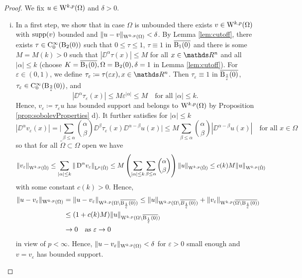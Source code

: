 \begin{proof}
  We fix $u \in \mathrm{W}^{k,p}(\Omega)$ and $\delta > 0$.
  \begin{enumerate}[i)]
    \item In a first step, we show that in case $\Omega$ is unbounded there exists $v \in \mathrm{W}^{k,p}(\Omega)$ with $\operatorname{supp}(v)$ bounded and $\|u - v\|_{\mathrm{W}^{k,p}(\Omega)} < \delta$.
      By Lemma \ref{lem:cutoff}, there exists $\tau \in \mathrm{C}_0^\infty(\mathrm{B}_2(0))$ such that $0 \leq \tau \leq 1$, $\tau \equiv 1$ in $\overline{\mathrm{B}_1(0)}$ and there is some $M = M(k) > 0$ such that $|\DD^\alpha \tau(x)| \leq M$ for all $x \in \R^n$ and all $|\alpha| \leq k$ (choose $K = \overline{\mathrm{B}_1(0)}, \Omega= \mathrm{B}_2(0), \delta = 1$ in Lemma \ref{lem:cutoff}).
      For $\varepsilon \in (0,1)$, we define $\tau_\varepsilon \coloneqq \tau(\varepsilon x), x \in \R^n$.
      Then $\tau_\varepsilon \equiv 1$ in $\overline{\mathrm{B}_{\frac{1}{\varepsilon}}(0)}$, $\tau_\varepsilon \in \mathrm{C}_0^\infty(\mathrm{B}_{\frac{2}{\varepsilon}}(0))$, and
      \begin{equation}
        |\DD^\alpha \tau_\varepsilon(x)| \leq M \varepsilon^{|\alpha|} \leq M \quad\text{for all } |\alpha| \leq k.
      \end{equation}
      Hence, $v_\varepsilon \coloneqq \tau_\varepsilon u$ has bounded support and belongs to $\mathrm{W}^{k,p}(\Omega)$ by Proposition \ref{prop:sobolevProperties} d).
      It further satisfies for $|\alpha| \leq k$
      $$
      |\DD^\alpha v_\varepsilon(x)| 
      = \Big| \sum_{\beta \leq \alpha} \binom{\alpha}{\beta} \DD^\beta \tau_\varepsilon(x) \DD^{\alpha - \beta} u(x) \Big|
      \leq M \sum_{\beta \leq \alpha} \binom{\alpha}{\beta} | \DD^{\alpha - \beta} u(x)| \quad\text{for all } x \in\Omega
      $$
      so that for all $\tilde\Omega \subset \Omega$ open we have
      $$
        \|v_\varepsilon\|_{\mathrm{W}^{k,p}(\tilde\Omega)}
        \leq \sum_{|\alpha|\leq k} \|\,{\operatorname{D}}^\alpha v_\varepsilon\|_{\mathrm{L}^p(\tilde\Omega)}
        \leq M \left( \sum_{|\alpha| \leq k} \sum_{\beta\leq\alpha} \binom{\alpha}{\beta} \right) \|u\|_{\mathrm{W}^{k,p}(\tilde\Omega)}
        \leq c(k) M \|u\|_{\mathrm{W}^{k,p}(\tilde\Omega)}
      $$
      with some constant $c(k) > 0$.
      Hence,
      \begin{align*}
        \|u - v_\varepsilon\|_{\mathrm{W}^{k,p}(\Omega)}
        &= \|u - v_\varepsilon\|_{\mathrm{W}^{k,p}(\Omega \setminus \overline{\mathrm{B}_{\frac{1}{\varepsilon}}(0)})}
        \leq \|u\|_{\mathrm{W}^{k,p}(\Omega \setminus \overline{B_{\frac{1}{\varepsilon}}(0)})} + \|v_\varepsilon\|_{\mathrm{W}^{k,p}(\overline{\Omega \setminus \mathrm{B}_{\frac{1}{\varepsilon}}(0)})} \\
        &\leq (1 + c(k)M) \|u\|_{\mathrm{W}^{k,p}(\Omega \setminus \overline{\mathrm{B}_{\frac{1}{\varepsilon}}(0)})} \\
        &\to 0 \quad\text{as } \varepsilon \to 0
      \end{align*}
      in view of $p < \infty$.
      Hence, $\|u - v_\varepsilon\|_{\mathrm{W}^{k,p}(\Omega)} < \delta$ for $\varepsilon > 0$ small enough and $v = v_\varepsilon$ has bounded support.


\end{enumerate}
\end{proof}
